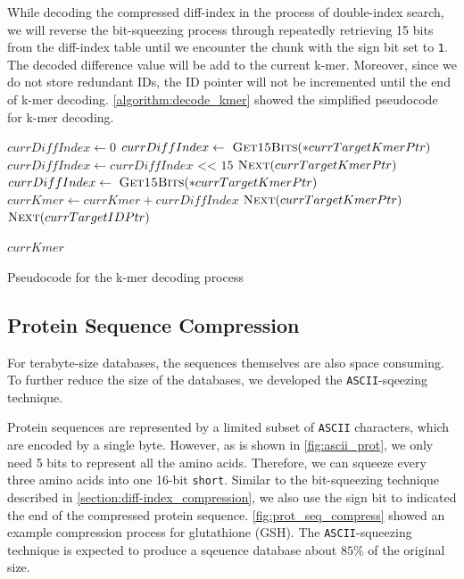 While decoding the compressed diff-index in the process of double-index search, we will reverse the bit-squeezing process through repeatedly retrieving 15 bits from the diff-index table until we encounter the chunk with the sign bit set to \texttt{1}.
The decoded difference value will be add to the current k-mer.
Moreover, since we do not store redundant IDs, the ID pointer will not be incremented until the end of k-mer decoding.
\cref{algorithm:decode_kmer} showed the simplified pseudocode for k-mer decoding.

\begin{algorithm}[htbp]
  \begin{algorithmic}
    \State $currDiffIndex \gets 0$
     
    \State $currDiffIndex \gets\ \textsc{Get15Bits}(*currTargetKmerPtr)$
    \State $currDiffIndex \gets currDiffIndex \texttt{ << } 15$
    \State $\textsc{Next}(currTargetKmerPtr)$
    \EndWhile
    \State $currDiffIndex \gets\ \textsc{Get15Bits}(*currTargetKmerPtr)$
    \State $currKmer \gets currKmer + currDiffIndex$
    \State $\textsc{Next}(currTargetKmerPtr)$
    \State $\textsc{Next}(currTargetIDPtr)$
    \par
    \Return $currKmer$
    \EndProcedure
    \caption{ Pseudocode for the k-mer decoding process} \label{algorithm:decode_kmer}
  \end{algorithmic}
\end{algorithm}

\subsection{Protein Sequence Compression} \label{section:protein_sequence_compression}

For terabyte-size databases, the sequences themselves are also space consuming.
To further reduce the size of the databases, we developed the \texttt{ASCII}-sqeezing technique.

Protein sequences are represented by a limited subset of \texttt{ASCII} characters, which are encoded by a single byte.
However, as is shown in \autoref{fig:ascii_prot}, we only need 5 bits to represent all the amino acids.
Therefore, we can squeeze every three amino acids into one 16-bit \texttt{short}.
Similar to the bit-squeezing technique described in \cref{section:diff-index_compression}, we also use the sign bit to indicated the end of the compressed protein sequence.
\autoref{fig:prot_seq_compress} showed an example compression process for glutathione (GSH).
The \texttt{ASCII}-squeezing technique is expected to produce a sqeuence database about $85\%$ of the original size.

